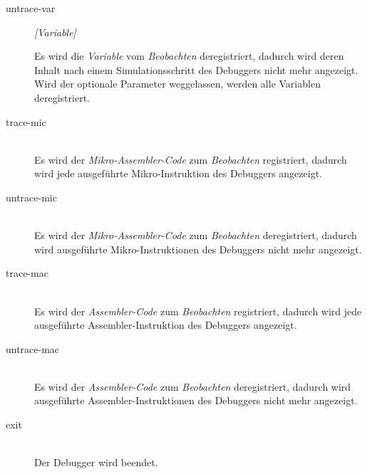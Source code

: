 \begin{description}
\item[untrace-var] \emph{[Variable]}

Es wird die \emph{Variable} vom \emph{Beobachten} deregistriert, dadurch wird deren Inhalt nach einem Simulationsschritt des Debuggers nicht mehr angezeigt. Wird der optionale Parameter weggelassen, werden alle Variablen deregistriert.

\item[trace-mic] \hspace*{\fill}\\

Es wird der \emph{Mikro-Assembler-Code} zum \emph{Beobachten} registriert, dadurch wird jede ausgeführte Mikro-Instruktion des Debuggers angezeigt.

\item[untrace-mic] \hspace*{\fill}\\

Es wird der \emph{Mikro-Assembler-Code} zum \emph{Beobachten} deregistriert, dadurch wird ausgeführte Mikro-Instruktionen des Debuggers nicht mehr angezeigt.

\item[trace-mac] \hspace*{\fill}\\

Es wird der \emph{Assembler-Code} zum \emph{Beobachten} registriert, dadurch wird jede ausgeführte Assembler-Instruktion des Debuggers angezeigt.

\item[untrace-mac] \hspace*{\fill}\\

Es wird der \emph{Assembler-Code} zum \emph{Beobachten} deregistriert, dadurch wird ausgeführte Assembler-Instruktionen des Debuggers nicht mehr angezeigt.

\item[exit] \hspace*{\fill}\\

Der Debugger wird beendet.
\end{description}


